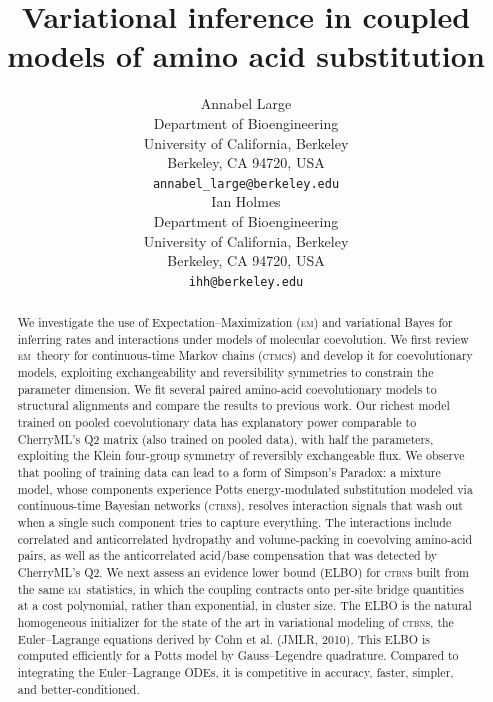 \documentclass{article}
\title{Variational inference in coupled models of amino acid substitution}
\author{%
	Annabel Large \\
	Department of Bioengineering\\
	University of California, Berkeley\\
	Berkeley, CA 94720, USA \\
	\texttt{annabel\_large@berkeley.edu} \\
	\And
	Ian Holmes \\
	Department of Bioengineering\\
	University of California, Berkeley\\
	Berkeley, CA 94720, USA \\
	\texttt{ihh@berkeley.edu} \\
}
\newcommand{\CTBN}{\textsc{ctbn}}
\newcommand{\CTMC}{\textsc{ctmc}}
\newcommand{\EM}{\textsc{em}}
\begin{document}
\maketitle

\begin{abstract}
We investigate the use of Expectation--Maximization (\EM) and variational Bayes for inferring rates and interactions under
models of molecular coevolution.
We first review \EM\ theory for continuous-time Markov chains (\CTMC s) and develop it for coevolutionary models,
exploiting exchangeability and reversibility symmetries to constrain the parameter dimension.
We fit several paired amino-acid coevolutionary models to structural alignments
and compare the results to previous work.
Our richest model trained on pooled coevolutionary data has explanatory power comparable to CherryML's Q2 matrix (also trained on pooled data), with half the parameters,
exploiting the Klein four-group symmetry of reversibly exchangeable flux.
We observe that pooling of training data can lead to a form of Simpson's Paradox: a mixture model,
whose components experience Potts energy-modulated substitution modeled via continuous-time Bayesian networks (\CTBN s),
resolves interaction signals that wash out when a single such component tries to capture everything.
The interactions include correlated and anticorrelated hydropathy and volume-packing in coevolving amino-acid pairs,
as well as the anticorrelated acid/base compensation that was detected by CherryML's Q2.
We next assess an evidence lower bound (ELBO) for \CTBN s built from the same \EM\ statistics, in which the coupling
contracts onto per-site bridge quantities at a cost polynomial, rather than exponential, in cluster size.
The ELBO is the natural homogeneous initializer for the state of the art in variational modeling of \CTBN s,
the Euler--Lagrange equations derived by Cohn et al. (JMLR, 2010).
This ELBO is computed efficiently for a Potts model by
Gauss--Legendre quadrature.
Compared to integrating the Euler--Lagrange ODEs, it is competitive in accuracy, faster, simpler, and better-conditioned.
\end{abstract}

\end{document}
